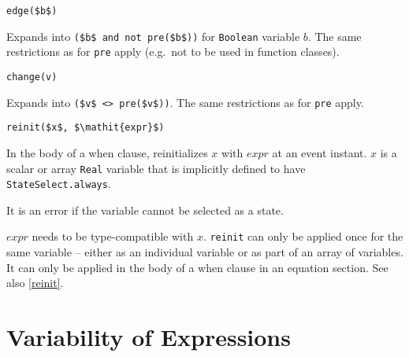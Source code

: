 \begin{operatordefinition}[edge]
\begin{synopsis}\begin{lstlisting}
edge($b$)
\end{lstlisting}\end{synopsis}
\begin{semantics}
Expands into \lstinline!($b$ and not pre($b$))! for \lstinline!Boolean! variable $b$.  The same restrictions as for \lstinline!pre! apply (e.g.\ not to be used in function classes).
\end{semantics}
\end{operatordefinition}

\begin{operatordefinition}[change]
\begin{synopsis}\begin{lstlisting}
change(v)
\end{lstlisting}\end{synopsis}
\begin{semantics}
Expands into \lstinline!($v$ <> pre($v$))!.  The same restrictions as for \lstinline!pre! apply.
\end{semantics}
\end{operatordefinition}

\begin{operatordefinition}[reinit]
\begin{synopsis}\begin{lstlisting}
reinit($x$, $\mathit{expr}$)
\end{lstlisting}\end{synopsis}
\begin{semantics}
In the body of a when clause, reinitializes $x$ with $\mathit{expr}$ at an event instant.  $x$ is a scalar or array \lstinline!Real! variable that is implicitly defined to have \lstinline!StateSelect.always!.
\begin{nonnormative}
It is an error if the variable cannot be selected as a state.
\end{nonnormative}
$\mathit{expr}$ needs to be type-compatible with $x$.  \lstinline!reinit! can only be applied once for the same variable -- either as an individual variable or as part of an array of variables.  It can only be applied in the body of a when clause in an equation section.  See also \cref{reinit}.
\end{semantics}
\end{operatordefinition}

\section{Variability of Expressions}\label{variability-of-expressions}

